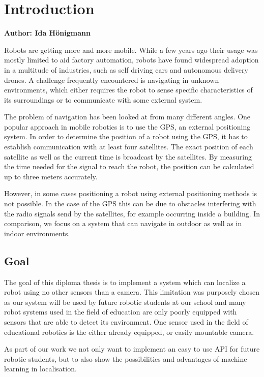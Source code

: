 \chapter{Introduction}

\textbf{Author: Ida Hönigmann}

\vspace{2mm}

Robots are getting more and more mobile. While a few years ago their usage was mostly limited to aid factory automation, robots have found widespread adoption in a multitude of industries, such as self driving cars and autonomous delivery drones.
A challenge frequently encountered is navigating in unknown environments, which either requires the robot to sense specific characteristics of its surroundings or to communicate with some external system.

The problem of navigation has been looked at from many different angles. One popular approach in mobile robotics is to use the GPS, an external positioning system. In order to determine the position of a robot using the GPS, it has to establish communication with at least four satellites. The exact position of each satellite as well as the current time is broadcast by the satellites. By measuring the time needed for the signal to reach the robot, the position can be calculated up to three meters accurately.

However, in some cases positioning a robot using external positioning methods is not possible. In the case of the GPS this can be due to obstacles interfering with the radio signals send by the satellites, for example occurring inside a building.
In comparison, we focus on a system that can navigate in outdoor as well as in indoor environments. 

\section{Goal}
The goal of this diploma thesis is to implement a system which can localize a robot using no other sensors than a camera. This limitation was purposely chosen as our system will be used by future robotic students at our school and many robot systems used in the field of education are only poorly equipped with sensors that are able to detect its environment. One sensor used in the field of educational robotics is the either already equipped, or easily mountable camera.

As part of our work we not only want to implement an easy to use API for future robotic students, but to also show the possibilities and advantages of machine learning in localisation.

